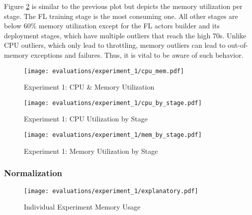 Figure \ref{fig:eval_1_simplest_memory_boxviolin} is similar to the previous plot but depicts the memory utilization per stage.
The FL training stage is the most consuming one.
All other stages are below 60\% memory utilization except for the FL actors builder and its deployment stages, which have multiple outliers that reach the high 70s.
Unlike CPU outliers, which only lead to throttling, memory outliers can lead to out-of-memory exceptions and failures.
Thus, it is vital to be aware of such behavior.

\begin{figure}[H]
    \begin{adjustwidth}{-0.2\paperwidth}{-0.2\paperwidth}
        \centering
        \texttt{[image: evaluations/experiment\_1/cpu\_mem.pdf]}
        \caption{Experiment 1: CPU \& Memory Utilization}
        \label{fig:eval_1_simplest_cpu_mem}
    \end{adjustwidth}
\end{figure}

\begin{figure}[p]
    \begin{adjustwidth}{-0.2\paperwidth}{-0.2\paperwidth}
        \centering
        \texttt{[image: evaluations/experiment\_1/cpu\_by\_stage.pdf]}
        \caption{Experiment 1: CPU Utilization by Stage}
        \label{fig:eval_1_simplest_cpu_boxviolin}
    \end{adjustwidth}

    \begin{adjustwidth}{-0.2\paperwidth}{-0.2\paperwidth}
        \centering
        \texttt{[image: evaluations/experiment\_1/mem\_by\_stage.pdf]}
        \caption{Experiment 1: Memory Utilization by Stage}
        \label{fig:eval_1_simplest_memory_boxviolin}
    \end{adjustwidth}
\end{figure}

\pagebreak
\subsubsection{Normalization}

\begin{figure}[h]
        \centering
        \texttt{[image: evaluations/experiment\_1/explanatory.pdf]}
        \caption{Individual Experiment Memory Usage}
        \label{fig:eval_1_simplest_explanation_shift}
\end{figure}

